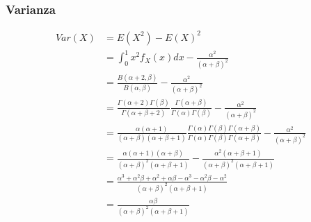 \documentclass{article}
\begin{document}
\begin{tcolorbox}[breakable]
    \subsubsection*{Varianza}
    \begin{align*}
        Var(X)&= E(X^2)-E(X)^2 \\
        &= \int_{0}^1 x^2f_X(x)dx 
        - \frac{\alpha^2}{(\alpha+\beta)^2} \\
        &= \frac{B(\alpha+2,\beta)}{B(\alpha, \beta)} 
        - \frac{\alpha^2}{(\alpha+\beta)^2} \\
        &= \frac{\Gamma(\alpha+2)\Gamma(\beta)}{\Gamma(\alpha+\beta+2)} \frac{\Gamma(\alpha+\beta)}{\Gamma(\alpha)\Gamma(\beta)}
        - \frac{\alpha^2}{(\alpha+\beta)^2} \\
        &= \frac{\alpha(\alpha+1)}{(\alpha+\beta)(\alpha+\beta+1)} \frac{\Gamma(\alpha)\Gamma(\beta)\Gamma(\alpha+\beta)}{\Gamma(\alpha)\Gamma(\beta)\Gamma(\alpha+\beta)} 
        - \frac{\alpha^2}{(\alpha+\beta)^2} \\
        &= \frac{\alpha(\alpha+1)(\alpha+\beta)}{(\alpha+\beta)^2(\alpha+\beta+1)} - \frac{\alpha^2(\alpha+\beta+1)}{(\alpha+\beta)^2(\alpha+\beta+1)} \\
        &= \frac{\alpha^3+\alpha^2\beta+ \alpha^2+\alpha \beta-\alpha^3- \alpha^2\beta  - \alpha^2}{(\alpha+\beta)^2(\alpha+\beta+1)} \\
        &= \frac{\alpha \beta}{(\alpha+\beta)^2(\alpha+\beta+1)}
    \end{align*}

\end{tcolorbox}
\end{document}

